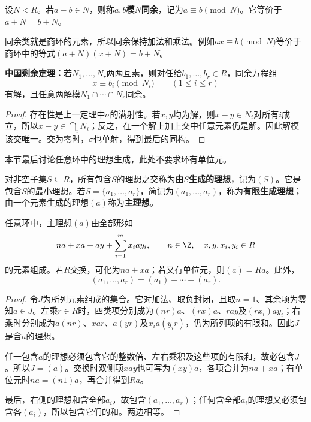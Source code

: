 \begin{definition}\label{p2:concept:c3-congruence}
设$N\lhd R$。若$a-b\in N$，则称$a,b$\textbf{模$N$同余}，记为$a\equiv b\pmod N$。它等价于$a+N=b+N$。
\end{definition}

同余类就是商环的元素，所以同余保持加法和乘法。例如$ax\equiv b\pmod N$等价于商环中的等式$(a+N)(x+N)=b+N$。

\begin{corollary}\label{p2:ring-crt-congruence}
\textbf{中国剩余定理：}若$N_1,\ldots,N_r$两两互素，则对任给$b_1,\ldots,b_r\in R$，同余方程组
\[
x\equiv b_i\pmod{N_i}\qquad(1\leq i\leq r)
\]
有解，且任意两解模$N_1\cap\cdots\cap N_r$同余。

\end{corollary}
\begin{proof}
存在性是上一定理中$\sigma$的满射性。若$x,y$均为解，则$x-y\in N_i$对所有$i$成立，所以$x-y\in\bigcap_iN_i$；反之，在一个解上加上交中任意元素仍是解。因此解模该交唯一。交为零时，$\sigma$也单射，得到最后的同构。
\end{proof}


本节最后讨论任意环中的理想生成，此处不要求环有单位元。

\begin{definition}\label{p2:concept:c3-generated-ideal}
对非空子集$S\subseteq R$，所有包含$S$的理想之交称为\textbf{由$S$生成的理想}，记为$(S)$。它是包含$S$的最小理想。若$S=\{a_1,\ldots,a_r\}$，简记为$(a_1,\ldots,a_r)$，称为\textbf{有限生成理想}；由一个元素生成的理想$(a)$称为\textbf{主理想}。
\end{definition}

\begin{proposition}
任意环中，主理想$(a)$由全部形如
\[
na+xa+ay+\sum_{i=1}^m x_iay_i,
\qquad n\in\Z,\quad x,y,x_i,y_i\in R
\]
的元素组成。若$R$交换，可化为$na+xa$；若又有单位元，则$(a)=Ra$。此外，
\[
(a_1,\ldots,a_r)=(a_1)+\cdots+(a_r).
\]
\end{proposition}
\begin{proof}
令$J$为所列元素组成的集合。它对加法、取负封闭，且取$n=1$、其余项为零知$a\in J$。左乘$r\in R$时，四类项分别成为$(nr)a$、$(rx)a$、$ray$及$(rx_i)ay_i$；右乘时分别成为$a(nr)$、$xar$、$a(yr)$及$x_i a(y_ir)$，仍为所列项的有限和。因此$J$是含$a$的理想。

任一包含$a$的理想必须包含它的整数倍、左右乘积及这些项的有限和，故必包含$J$。所以$J=(a)$。交换时双侧项$xay$也可写为$(xy)a$，各项合并为$na+xa$；有单位元时$na=(n1)a$，再合并得到$Ra$。

最后，右侧的理想和含全部$a_i$，故包含$(a_1,\ldots,a_r)$；任何含全部$a_i$的理想又必须包含各$(a_i)$，所以包含它们的和。两边相等。
\end{proof}


